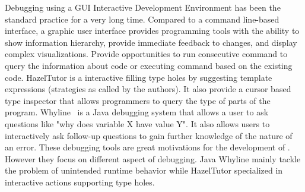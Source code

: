 



Debugging using a GUI Interactive Development Environment has been the standard practice for a very long time. Compared to a command line-based interface, a graphic user interface provides programming tools with the ability to show information hierarchy, provide immediate feedback to changes, and display complex visualizations. Provide opportunities to run consecutive command to query the information about code or executing command based on the existing code.
HazelTutor is a interactive filling type holes by suggesting template expressions (strategies as called by the authors). It also provide a cursor based type inspector that allows programmers to query the type of parts of the program.
Whyline~\cite{ko2009finding} is a Java debugging system that allows a user to ask questions like "why does variable X have value Y". It also allows users to interactively ask follow-up questions to gain further knowledge of the nature of an error.  These debugging tools are great motivations for the development of \chameleon{}. However they focus on different aspect of debugging. Java Whyline mainly tackle the problem of unintended runtime behavior while HazelTutor specialized in interactive actions supporting type holes.


